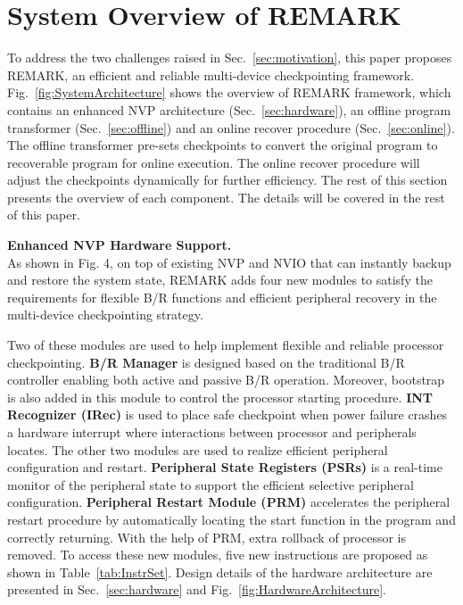 \section{System Overview of REMARK} \label{sec:system}
%
To address the two challenges raised in Sec.~\ref{sec:motivation}, this paper proposes REMARK, an efficient and reliable multi-device checkpointing framework.
Fig.~\ref{fig:SystemArchitecture} shows the overview of REMARK framework, which contains an enhanced NVP architecture (Sec.~\ref{sec:hardware}), an offline program transformer (Sec.~\ref{sec:offline}) and an online recover procedure (Sec.~\ref{sec:online}).
The offline transformer pre-sets checkpoints to convert the original program to recoverable program for online execution.
The online recover procedure will adjust the checkpoints dynamically for further efficiency.
The rest of this section presents the overview of each component.
The details will be covered in the rest of this paper. 

\noindent\textbf{Enhanced NVP Hardware Support.} \\
As shown in Fig. 4, on top of existing NVP and NVIO that can instantly backup and restore the system state, REMARK adds four new modules to satisfy the requirements for flexible B/R functions and efficient peripheral recovery in the multi-device checkpointing strategy.

Two of these modules are used to help implement flexible and reliable processor checkpointing.
\textbf{B/R Manager} is designed based on the traditional B/R controller enabling both active and passive B/R operation.
Moreover, bootstrap is also added in this module to control the processor starting procedure.
\textbf{INT Recognizer (IRec)} is used to place safe checkpoint when power failure crashes a hardware interrupt where interactions between processor and peripherals locates.
The other two modules are used to realize efficient peripheral configuration and restart.
\textbf{Peripheral State Registers (PSRs)} is a real-time monitor of the peripheral state to support the efficient selective peripheral configuration.
\textbf{Peripheral Restart Module (PRM)} accelerates the peripheral restart procedure by automatically locating the start function in the program and correctly returning.
With the help of PRM, extra rollback of processor is removed.
To access these new modules, five new instructions are proposed as shown in Table~\ref{tab:InstrSet}.
Design details of the hardware architecture are presented in Sec.~\ref{sec:hardware} and Fig.~\ref{fig:HardwareArchitecture}.


